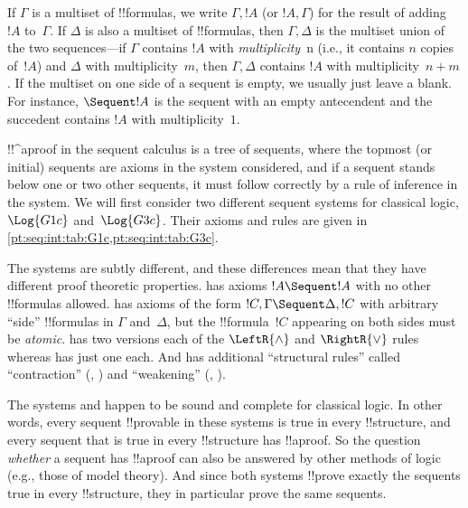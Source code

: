 \documentclass[../../../include/open-logic-section]{subfiles}
\begin{document}
If $\Gamma$ is a multiset of !!{formula}s, we write $\Gamma, !A$ (or
$!A, \Gamma$) for the result of adding $!A$ to~$\Gamma$. If $\Delta$
is also a multiset of !!{formula}s, then $\Gamma, \Delta$ is the
multiset union of the two sequences---if $\Gamma$ contains $!A$ with
\emph{multiplicity}~n (i.e., it contains $n$ copies of~$!A$) and
$\Delta$ with multiplicity~$m$, then $\Gamma, \Delta$ contains $!A$
with multiplicity~$n+m$. If the multiset on one side of a sequent is
empty, we usually just leave a blank. For instance, $\Sequent !A$ is
the sequent with an empty antecendent and the succedent contains $!A$
with multiplicity~$1$.

!!^a{proof} in the sequent calculus is a tree of sequents, where
the topmost (or initial) sequents are axioms in the system considered,
and if a sequent stands below one or two other sequents, it must
follow correctly by a rule of inference in the system. We will first
consider two different sequent systems for classical logic,
$\Log{G1c}$ and~$\Log{G3c}$. Their axioms and rules are given in
\cref{pt:seq:int:tab:G1c,pt:seq:int:tab:G3c}. 




The systems are subtly different, and these differences mean that they
have different proof theoretic properties.  has axioms $!A
\Sequent !A$ with no other !!{formula}s allowed.  has axioms
of the form $!C, \Gamma \Sequent \Delta, !C$ with arbitrary ``side''
!!{formula}s in $\Gamma$ and~$\Delta$, but the !!{formula}~$!C$
appearing on both sides must be \emph{atomic}.  has two versions
each of the $\LeftR{\land}$ and $\RightR{\lor}$ rules whereas 
has just one each. And  has additional ``structural rules''
called ``contraction'' (\LeftR{\Contraction}, \RightR{\Contraction})
and ``weakening'' (\LeftR{\Weakening}, \RightR{\Weakening}).

The systems  and  happen to be sound and complete
for classical logic. In other words, every sequent !!{provable} in
these systems is true in every !!{structure}, and every sequent that
is true in every !!{structure} has !!a{proof}. So the question
\emph{whether} a sequent has !!a{proof} can also be answered by other
methods of logic (e.g., those of model theory). And since both systems
!!{prove} exactly the sequents true in every !!{structure}, they in
particular prove the same sequents.
\end{document}
